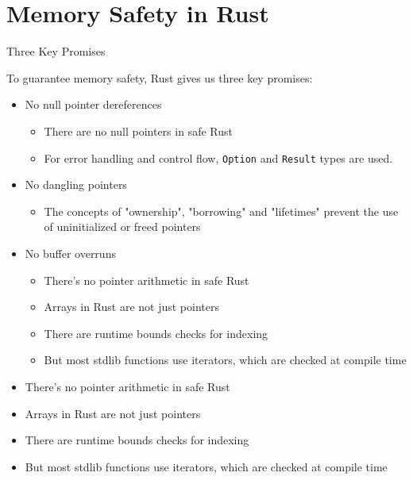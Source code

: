 \section{Memory Safety in Rust}


\begin{frame}{Three Key Promises}

To guarantee memory safety, Rust gives us three key promises:

\begin{itemize}
	\item No null pointer dereferences
		\pause
		\begin{itemize}
			\item There are no null pointers in safe Rust
			\item For error handling and control flow, \texttt{Option} and
				\texttt{Result} types are used.
		\end{itemize}
	\pause
	\item No dangling pointers
		\pause
		\begin{itemize}
			\item The concepts of "ownership", "borrowing" and "lifetimes" prevent the
				use of uninitialized or freed pointers
		\end{itemize}
	\pause
	\item No buffer overruns
		\pause
		\begin{itemize}
		\item There's no pointer arithmetic in safe Rust
		\item Arrays in Rust are not just pointers
		\item There are runtime bounds checks for indexing
		\item But most stdlib functions use iterators, which are checked at
			compile time
		\end{itemize}
\end{itemize}

\end{frame}





\begin{frame}
\begin{itemize}
	\item There's no pointer arithmetic in safe Rust
	\item Arrays in Rust are not just pointers
	\item There are runtime bounds checks for indexing
	\item But most stdlib functions use iterators, which are checked at
		compile time
\end{itemize}
\end{frame}
